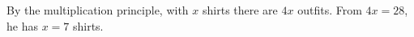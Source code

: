 By the multiplication principle, with $x$ shirts there are $4x$ outfits. From $4x=28$, he has $x=\boxed{7}$ shirts.
